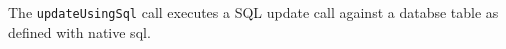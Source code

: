 The \verb+updateUsingSql+ call executes a SQL update call against a databse table as defined with native sql.
